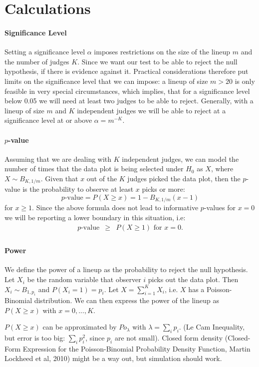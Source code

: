 \documentclass[11pt]{article}
\begin{document}
\section{Calculations}
\paragraph{Significance Level}
Setting a significance level $\alpha$ imposes restrictions on the size of the lineup $m$ and the number of judges $K$. Since we want our test to be able to reject the null hypothesis, if there is evidence against it. Practical considerations therefore put limits on the significance level that we can impose: a lineup of size $m > 20$ is only feasible in very special circumstances, which implies, that for a significance level below 0.05 we will need at least two judges to be able to reject. Generally, with a lineup of size $m$ and $K$ independent judges we will be able to reject at a significance level at or above $\alpha = m^{-K}$.

\paragraph{$p$-value}
Assuming that we are dealing with $K$ independent judges, we can model the number of times that the data plot is being selected under $H_0$ as $X$, where $X \sim B_{K, 1/m}$. Given that $x$ out of the $K$ judges picked the data plot, then  the $p$-value is the probability to observe at least $x$ picks or more:
\[
p\text{-value}  =  P(X \ge x) = 1 - B_{K, 1/m} (x-1)
\]
for $x \ge 1$.
Since the above formula does not lead to informative $p$-values for  $x=0$ we will be reporting a lower boundary in this situation, i.e:
\begin{eqnarray*}
p\text{-value} &\ge& P(X \ge 1) \text{ for } x= 0.\\
\end{eqnarray*}

\paragraph{Power}
We define the power of a lineup as the probability to reject the null hypothesis. Let $X_i$ be the random variable that observer $i$ picks out the data plot. Then $X_i \sim B_{1, p_i}$ and $P(X_i = 1) = p_i$. Let $X = \sum_{i=1}^K X_i$, i.e. $X$ has a Poisson-Binomial distribution.
We can then express the power of the lineup as $P(X \ge x)$ with $x = 0, ..., K$.

$P(X \ge x)$ can be approximated by $Po_\lambda$ with $\lambda= \sum_i p_i$. (Le Cam Inequality, but error is too big: $\sum_i p_i^2$, since $p_i$ are not small). Closed form density (Closed-Form Expression for the Poisson-Binomial Probability Density Function, Martin Lockheed et al, 2010) might be a way out, but simulation should work. 
\end{document}
